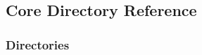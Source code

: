 \subsection{Core Directory Reference}
\label{dir_c6310732a22f63c0c2fc5595561e68f1}
\subsubsection*{Directories}
\begin{DoxyCompactItemize}
\end{DoxyCompactItemize}
